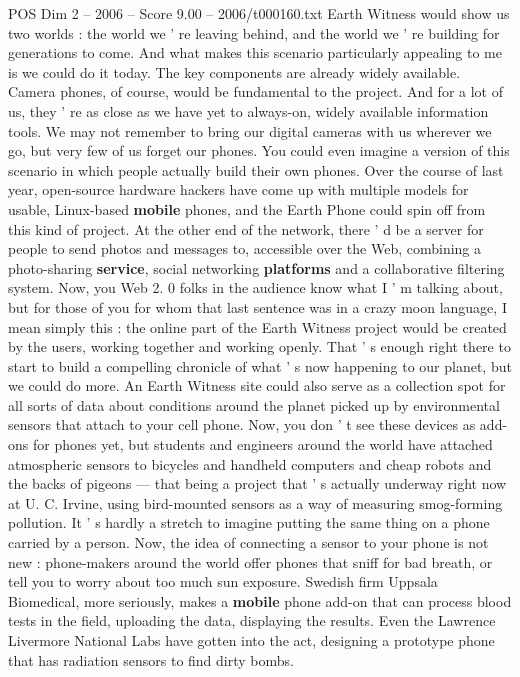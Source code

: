 \begin{textsample}{POS Dim 2 – 2006 – Score 9.00 – 2006/t000160.txt}
Earth Witness would show us two worlds : the world we ' re leaving behind, and the world we ' re building for generations to come.
And what makes this scenario particularly appealing to me is we could do it today.
The key components are already widely available.
Camera phones, of course, would be fundamental to the project.
And for a lot of us, they ' re as close as we have yet to always-on, widely available information tools.
We may not remember to bring our digital cameras with us wherever we go, but very few of us forget our phones.
You could even imagine a version of this scenario in which people actually build their own phones.
Over the course of last year, open-source hardware hackers have come up with multiple models for usable, Linux-based \textbf{mobile} phones, and the Earth Phone could spin off from this kind of project.
At the other end of the network, there ' d be a server for people to send photos and messages to, accessible over the Web, combining a photo-sharing \textbf{service}, social networking \textbf{platforms} and a collaborative filtering system.
Now, you Web 2. 0 folks in the audience know what I ' m talking about, but for those of you for whom that last sentence was in a crazy moon language, I mean simply this : the online part of the Earth Witness project would be created by the users, working together and working openly.
That ' s enough right there to start to build a compelling chronicle of what ' s now happening to our planet, but we could do more.
An Earth Witness site could also serve as a collection spot for all sorts of data about conditions around the planet picked up by environmental sensors that attach to your cell phone.
Now, you don ' t see these devices as add-ons for phones yet, but students and engineers around the world have attached atmospheric sensors to bicycles and handheld computers and cheap robots and the backs of pigeons — that being a project that ' s actually underway right now at U.
C.
Irvine, using bird-mounted sensors as a way of measuring smog-forming pollution.
It ' s hardly a stretch to imagine putting the same thing on a phone carried by a person.
Now, the idea of connecting a sensor to your phone is not new : phone-makers around the world offer phones that sniff for bad breath, or tell you to worry about too much sun exposure.
Swedish firm Uppsala Biomedical, more seriously, makes a \textbf{mobile} phone add-on that can process blood tests in the field, uploading the data, displaying the results.
Even the Lawrence Livermore National Labs have gotten into the act, designing a prototype phone that has radiation sensors to find dirty bombs.

\end{textsample}
